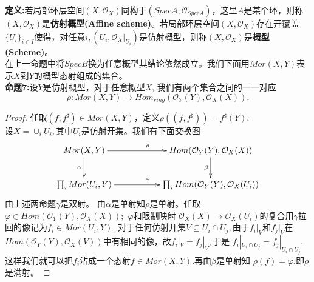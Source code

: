 \documentclass[UTF8]{article}
\begin{document}
\textbf{定义:}若局部环层空间$(X,\mathcal{O}_{X})$同构于$(SpecA,\mathcal{O}_{SpecA})$，这里$A$是某个环，则称$(X,\mathcal{O}_{X})$是\textbf{仿射概型(Affine scheme)}。若局部环层空间$(X,\mathcal{O}_{X})$存在开覆盖$\{U_{i}\}_{i\in I}$使得，对任意$i,(U_{i},\mathcal{O}_{X}|_{U_{i}})$是仿射概型，则称$(X,\mathcal{O}_{X})$是\textbf{概型(Scheme)}。\\

在上一命题中将$SpecB$换为任意概型其结论依然成立。我们下面用$Mor(X,Y)$表示$X$到$Y$的概型态射组成的集合。\\
\textbf{命题7:}设$Y$是仿射概型，对于任意概型$X$,
我们有两个集合之间的一一对应
$$
\rho:Mor(X,Y)\rightarrow Hom_{ring}(\mathcal{O}_{Y}(Y),\mathcal{O}_{X}(X)).
$$
\begin{proof}
	任取$(f,f^{\sharp})\in Mor(X,Y)$，定义$\rho((f,f^{\sharp}))=f^{\sharp}(Y).$\\
	设$X=\cup_{i}U_{i},$其中$U_{i}$是仿射开集。我们有下面交换图
	$$
	\xymatrix{
Mor(X,Y)\ar[rr]^{\rho}\ar[d]_{\alpha}&&Hom(\mathcal{O}_{Y}(Y),\mathcal{O}_{X}(X))\ar[d]_{\beta}\\
\prod_{i}Mor(U_{i},Y)\ar[rr]^{\gamma}&&\prod_{i}Hom(\mathcal{O}_{Y}(Y),\mathcal{O}_{X}(U_{i}))	
}
	$$
由上述两命题$\gamma$是双射。
由$\alpha$是单射知$\rho$是单射。任取$\varphi\in Hom(\mathcal{O}_{Y}(Y),\mathcal{O}_{X}(X));$ $\varphi$和限制映射
$\mathcal{O}_{X}(X)\rightarrow \mathcal{O}_{X}(U_{i})$的复合用$\gamma$拉回的像记为$f_{i}\in Mor(U_{i},Y).$
对于任何仿射开集$V\subseteq U_{i}\cap U_{j},$由于$f_{i}|_{V}$和$f_{j}|_{V}$在
$Hom(\mathcal{O}_{Y}(Y),\mathcal{O}_{X}(V))$中有相同的像，故$f_{i}|_{V}=f_{j}|_{V},$于是
$f_{i}|_{U_{i}\cap U_{j}}=f_{j}|_{U_{i}\cap U_{j}}$.这样我们就可以把$f_{i}$沾成一个态射$f\in Mor(X,Y)$.再由$\beta$是单射知
$\rho(f)=\varphi.$即$\rho$是满射。
\end{proof}
\end{document}
